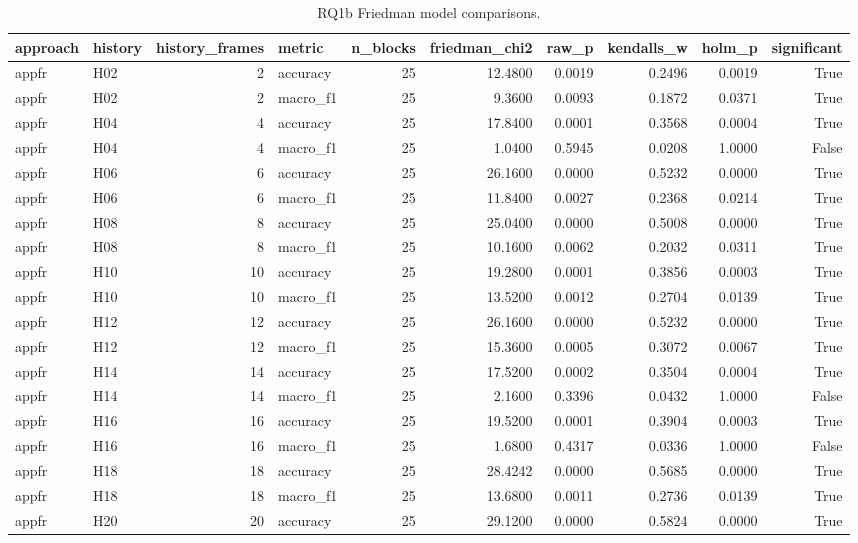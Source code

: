 \begin{table}[tbp]
\caption{RQ1b Friedman model comparisons.}
\label{tab:rq1b_model_friedman}
\begin{tabular}{llrlrrrrrr}
\toprule
approach & history & history\_frames & metric & n\_blocks & friedman\_chi2 & raw\_p & kendalls\_w & holm\_p & significant \\
\midrule
appfr & H02 & 2 & accuracy & 25 & 12.4800 & 0.0019 & 0.2496 & 0.0019 & True \\
appfr & H02 & 2 & macro\_f1 & 25 & 9.3600 & 0.0093 & 0.1872 & 0.0371 & True \\
appfr & H04 & 4 & accuracy & 25 & 17.8400 & 0.0001 & 0.3568 & 0.0004 & True \\
appfr & H04 & 4 & macro\_f1 & 25 & 1.0400 & 0.5945 & 0.0208 & 1.0000 & False \\
appfr & H06 & 6 & accuracy & 25 & 26.1600 & 0.0000 & 0.5232 & 0.0000 & True \\
appfr & H06 & 6 & macro\_f1 & 25 & 11.8400 & 0.0027 & 0.2368 & 0.0214 & True \\
appfr & H08 & 8 & accuracy & 25 & 25.0400 & 0.0000 & 0.5008 & 0.0000 & True \\
appfr & H08 & 8 & macro\_f1 & 25 & 10.1600 & 0.0062 & 0.2032 & 0.0311 & True \\
appfr & H10 & 10 & accuracy & 25 & 19.2800 & 0.0001 & 0.3856 & 0.0003 & True \\
appfr & H10 & 10 & macro\_f1 & 25 & 13.5200 & 0.0012 & 0.2704 & 0.0139 & True \\
appfr & H12 & 12 & accuracy & 25 & 26.1600 & 0.0000 & 0.5232 & 0.0000 & True \\
appfr & H12 & 12 & macro\_f1 & 25 & 15.3600 & 0.0005 & 0.3072 & 0.0067 & True \\
appfr & H14 & 14 & accuracy & 25 & 17.5200 & 0.0002 & 0.3504 & 0.0004 & True \\
appfr & H14 & 14 & macro\_f1 & 25 & 2.1600 & 0.3396 & 0.0432 & 1.0000 & False \\
appfr & H16 & 16 & accuracy & 25 & 19.5200 & 0.0001 & 0.3904 & 0.0003 & True \\
appfr & H16 & 16 & macro\_f1 & 25 & 1.6800 & 0.4317 & 0.0336 & 1.0000 & False \\
appfr & H18 & 18 & accuracy & 25 & 28.4242 & 0.0000 & 0.5685 & 0.0000 & True \\
appfr & H18 & 18 & macro\_f1 & 25 & 13.6800 & 0.0011 & 0.2736 & 0.0139 & True \\
appfr & H20 & 20 & accuracy & 25 & 29.1200 & 0.0000 & 0.5824 & 0.0000 & True \\

\end{tabular}
\end{table}
